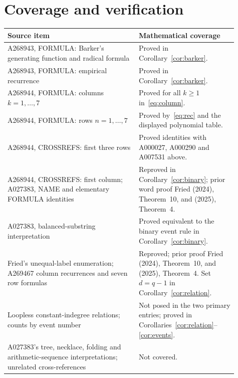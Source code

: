 \documentclass[11pt]{article}
\begin{document}
\section{Coverage and verification}
\begin{center}
\small
\begin{tabular}{>{\raggedright\arraybackslash}p{0.52\linewidth}>{\raggedright\arraybackslash}p{0.39\linewidth}}
\toprule
Source item & Mathematical coverage \\
\midrule
A268943, FORMULA: Barker's generating function and radical formula
& Proved in Corollary~\ref{cor:barker}. \\
A268943, FORMULA: empirical recurrence
& Proved in Corollary~\ref{cor:barker}. \\
A268944, FORMULA: columns $k=1,\ldots,7$
& Proved for all $k\geq1$ in~\eqref{eq:column}. \\
A268944, FORMULA: rows $n=1,\ldots,7$
& Proved by~\eqref{eq:rec} and the displayed polynomial table. \\
A268944, CROSSREFS: first three rows
& Proved identities with A000027, A000290 and A007531 above. \\
A268944, CROSSREFS: first column; A027383, NAME and elementary FORMULA identities
& Reproved in Corollary~\ref{cor:binary}; prior word proof Fried (2024), Theorem~10, and (2025), Theorem~4. \\
A027383, balanced-substring interpretation
& Proved equivalent to the binary event rule in Corollary~\ref{cor:binary}. \\
Fried's unequal-label enumeration; A269467 column recurrences and seven row formulas
& Reproved; prior proof Fried (2024), Theorem~10, and (2025), Theorem~4. Set $d=q-1$ in Corollary~\ref{cor:relation}. \\
Loopless constant-indegree relations; counts by event number
& Not posed in the two primary entries; proved in Corollaries~\ref{cor:relation}--\ref{cor:events}. \\
A027383's tree, necklace, folding and arithmetic-sequence interpretations; unrelated cross-references
& Not covered. \\
\bottomrule
\end{tabular}
\end{center}
\end{document}
